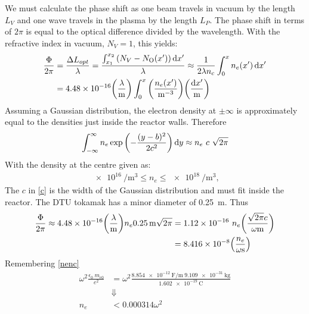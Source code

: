 We must calculate the phase shift as one beam travels in vacuum by the length \(L_V\) and one wave travels in the plasma by the length \(L_P\). The phase shift in terms of \(2 \pi\) is equal to the optical difference divided by the wavelength. With the refractive index in vacuum, \(N_V=1\), this yields:
\begin{align}
	\frac{\Phi}{2\pi} & = \frac{\Delta L_{opt}}{\lambda} = \frac{\int_{x_1}^{x_2}\pqty{N_V-N_{\mathrm{O}}(x')}\dd{x'}}{\lambda} \approx \frac{1}{2\lambda n_c}\int_{0}^{x}n_e(x')\dd{x'} \nonumber \\
	                  & = 4.48\times 10^{-16} \pqty{\frac{\lambda}{\si{\meter}}}\int_{0}^{x}\pqty{\frac{n_e(x')}{\si{\per\meter\cubed}}}\pqty{\frac{\dd{x'}}{\si{\meter}}} \label{Phipi}
\end{align}
Assuming a Gaussian distribution, the electron density at \(\pm\infty\) is approximately equal to the densities just inside the reactor walls. Therefore
\begin{align}
	\int_{-\infty}^{\infty}n_e \exp\pqty{-\frac{(y-b)^2}{2c^2}}\dd{y} \approx n_e\ c\ \sqrt{2\pi}\label{c}
\end{align}
With the density at the centre given as:
\begin{align}
	\SI{e16}{\per\meter\cubed} \leq n_e \leq \SI{e18}{\per\meter\cubed},
\end{align}
The \(c\) in \cref{c} is the width of the Gaussian distribution and must fit inside the reactor. The DTU tokamak has a minor diameter of \SI{0.25}{\meter}. Thus
\begin{align}
	\frac{\Phi}{2\pi} \approx 4.48\times 10^{-16}\pqty{\frac{\lambda}{\si{\meter}}}n_e\SI{0.25}{\meter}\sqrt{2\pi} & = 1.12\times 10^{-16}\ n_e  \pqty{\frac{\sqrt{2\pi} c}{\omega\si{\meter}}} \nonumber \\
	                                                                                                               & = 8.416\times 10^{-8}\pqty{\frac{n_e}{\omega\si{\second}}}\label{Phipi2}
\end{align}
Remembering \cref{nenc}
\begin{align}
	\omega^2\frac{\epsilon_0\ m_{e0}}{e^2} & = \omega^2\frac{\SI{8.854e-12}{\farad\per\meter}\ \SI{9.109e-31}{\kilo\gram}}{\SI{1.602e-19}{\coulomb}} \\
	                                       & \Downarrow\nonumber                                                                                     \\
	n_e                                    & < 0.000314\omega^2 \label{co}
\end{align}

